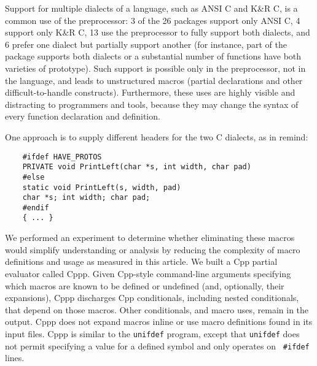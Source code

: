 \documentclass[10pt]{article}
\def\typeofdocument{article}    %
\def\numpackages{26}
\newcommand{\pkg}[1]{\textsf{#1}}
\begin{document}

%

Support for multiple dialects of a language, such as ANSI C and K\&R C, is
a common use of the preprocessor:  3 of the {\numpackages} packages support
only ANSI C, 4 support only K\&R C, 13 use the preprocessor to fully
support both dialects, and 6 prefer one dialect but partially support
another (for instance, part of the package supports both dialects or a
substantial number of functions have both varieties of prototype).  Such
support is possible only in the preprocessor, not in the language, and
leads to unstructured macros (partial declarations and other
difficult-to-handle constructs).  Furthermore, these uses are highly
visible and distracting to programmers and tools, because they may change
the syntax of every function declaration and definition.


One approach is to supply different headers for the two C dialects, as in
\pkg{remind}:
{\small
\begin{verbatim}
    #ifdef HAVE_PROTOS
    PRIVATE void PrintLeft(char *s, int width, char pad)
    #else
    static void PrintLeft(s, width, pad)
    char *s; int width; char pad;
    #endif
    { ... }
\end{verbatim}
}

We performed an experiment to determine whether eliminating these macros
would simplify understanding or analysis by reducing the complexity of
macro definitions and usage as measured in this \typeofdocument.  We built
a Cpp partial evaluator called Cppp.  Given Cpp-style command-line
arguments specifying which macros are known to be defined or undefined
(and, optionally, their expansions), Cppp discharges Cpp conditionals,
including nested conditionals, that depend on those macros.  Other
conditionals, and macro uses, remain in the output.  Cppp does not expand
macros inline or use macro definitions found in its input files.  Cppp is
similar to the {\tt unifdef} program, except that {\tt unifdef} does not
permit specifying a value for a defined symbol and only operates on {\tt
\#ifdef} lines.
\end{document}
